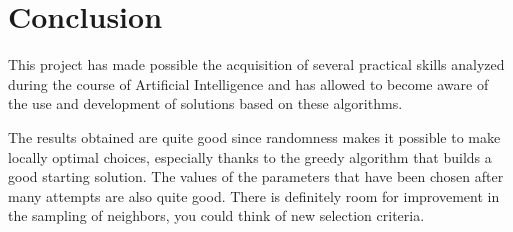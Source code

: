 \documentclass[11pt, oneside]{article}
\begin{document}
\pagebreak

\qquad

\qquad

\qquad

\qquad

\qquad

\qquad

\qquad

\qquad

\qquad

\qquad

\qquad


\section{Conclusion}

\qquad

\qquad

This project has made possible the acquisition of several practical skills analyzed during the course of Artificial Intelligence and has allowed to become aware of the use and development of solutions based on these algorithms.

The results obtained are quite good since randomness makes it possible to make locally optimal choices, especially thanks to the greedy algorithm that builds a good starting solution. The values of the parameters that have been chosen after many attempts are also quite good. There is definitely room for improvement in the sampling of neighbors, you could think of new selection criteria.   

\qquad

\qquad




\pagebreak
\end{document}
